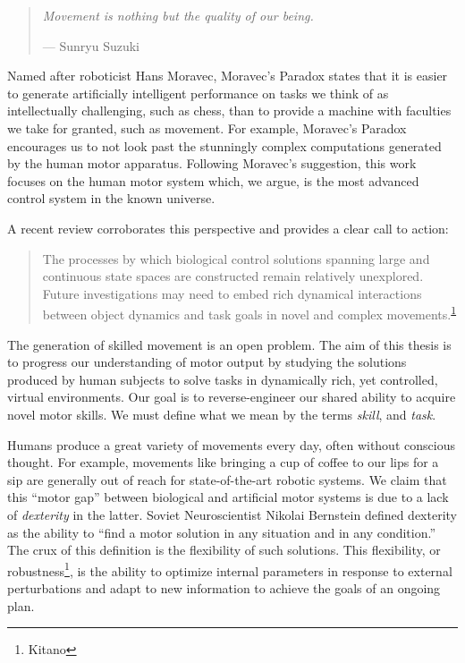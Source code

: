 {            \begin{quote}
            \emph{Movement is nothing but the quality of our being.}

            --- Sunryu Suzuki
            \end{quote}

            Named after roboticist Hans Moravec, Moravec's Paradox
            states that it is easier to generate artificially
            intelligent performance on tasks we think of as
            intellectually challenging, such as chess, than to provide a
            machine with faculties we take for granted, such as
            movement. For example, Moravec's Paradox encourages us to
            not look past the stunningly complex computations generated
            by the human motor apparatus. Following Moravec's
            suggestion, this work focuses on the human motor system
            which, we argue, is the most advanced control system in the
            known universe.

            A recent review corroborates this perspective and provides a
            clear call to action:

            \begin{quote}
            The processes by which biological control solutions spanning
            large and continuous state spaces are constructed remain
            relatively unexplored. Future investigations may need to
            embed rich dynamical interactions between object dynamics
            and task goals in novel and complex
            movements.\textsuperscript{\protect\hyperlink{ref-McNamee2019}{1}}
            \end{quote}

            The generation of skilled movement is an open problem. The
            aim of this thesis is to progress our understanding of motor
            output by studying the solutions produced by human subjects
            to solve tasks in dynamically rich, yet controlled, virtual
            environments. Our goal is to reverse-engineer our shared
            ability to acquire novel motor skills. We must define what
            we mean by the terms \emph{skill}, and \emph{task}.

            Humans produce a great variety of movements every day, often
            without conscious thought. For example, movements like
            bringing a cup of coffee to our lips for a sip are generally
            out of reach for state-of-the-art robotic systems. We claim
            that this ``motor gap'' between biological and artificial
            motor systems is due to a lack of \emph{dexterity} in the
            latter. Soviet Neuroscientist Nikolai Bernstein defined
            dexterity as the ability to ``find a motor solution in any
            situation and in any condition.'' The crux of this
            definition is the flexibility of such solutions. This
            flexibility, or robustness\footnote{Kitano}, is the ability
            to optimize internal parameters in response to external
            perturbations and adapt to new information to achieve the
            goals of an ongoing plan.

}
